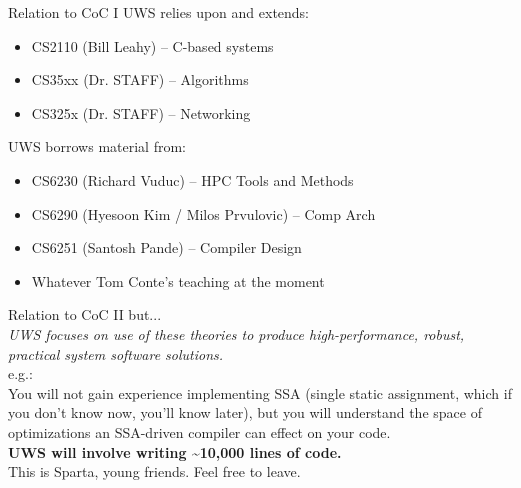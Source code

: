 \documentclass{beamer}
\begin{document}
\begin{frame}{Relation to CoC I}
UWS relies upon and extends:
\begin{itemize}
\item CS2110 (Bill Leahy) -- C-based systems
\item CS35xx (Dr. STAFF) -- Algorithms
\item CS325x (Dr. STAFF) -- Networking
\end{itemize}
UWS borrows material from:
\begin{itemize}
\item CS6230 (Richard Vuduc) -- HPC Tools and Methods
\item CS6290 (Hyesoon Kim / Milos Prvulovic) -- Comp Arch
\item CS6251 (Santosh Pande) -- Compiler Design
\item Whatever Tom Conte's teaching at the moment
\end{itemize}
\end{frame}

\begin{frame}{Relation to CoC II}
but... \\
\emph{UWS focuses on {\it use} of these theories to produce high-performance,
robust, {\it practical} system software solutions.}\linebreak \\
e.g.: \\
You will not gain experience implementing SSA (single static
assignment, which if you don't know now, you'll know later), but you will
understand the space of optimizations an SSA-driven compiler can effect on your
code.\linebreak \\
{\bf UWS will involve writing \~{}10,000 lines of code.}\linebreak \\
This is Sparta, young friends. Feel free to leave.
\end{frame}
\end{document}
